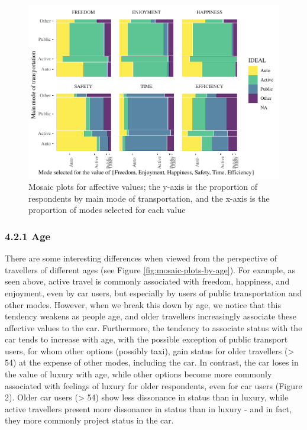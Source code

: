 \documentclass[]{elsarticle} %
\makeatletter
\def\maxwidth{\ifdim\Gin@nat@width>\linewidth\linewidth
\else\Gin@nat@width\fi}
\let\Oldincludegraphics\includegraphics
\renewcommand{\includegraphics}[1]{\Oldincludegraphics[width=\maxwidth]{#1}}
\makeatother
\begin{document}
\begin{figure}
\centering
\includegraphics{Dissonance_Santiago_v1_files/figure-latex/figure-mosaic-plots-by-attribute-1.pdf}
\caption{\label{fig:mosaic-plots-by-attribute}Mosaic plots for affective
values; the y-axis is the proportion of respondents by main mode of
transportation, and the x-axis is the proportion of modes selected for
each value}
\end{figure}

\hypertarget{age-1}{%
\subsubsection{4.2.1 Age}\label{age-1}}

There are some interesting differences when viewed from the perspective
of travellers of different ages (see Figure
\ref{fig:mosaic-plots-by-age}). For example, as seen above, active
travel is commonly associated with freedom, happiness, and enjoyment,
even by car users, but especially by users of public transportation and
other modes. However, when we break this down by age, we notice that
this tendency weakens as people age, and older travellers increasingly
associate these affective values to the car. Furthermore, the tendency
to associate status with the car tends to increase with age, with the
possible exception of public transport users, for whom other options
(possibly taxi), gain status for older travellers (\textgreater{} 54) at
the expense of other modes, including the car. In contrast, the car
loses in the value of luxury with age, while other options become more
commonly associated with feelings of luxury for older respondents, even
for car users (Figure 2). Older car users (\textgreater{} 54) show less
dissonance in status than in luxury, while active travellers present
more dissonance in status than in luxury - and in fact, they more
commonly project status in the car.
\end{document}
